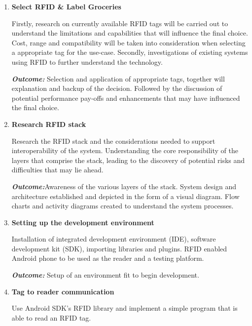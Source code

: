 \documentclass[a4paper, 11pt]{article}
\begin{document}
\begin{enumerate}
    \item \textbf{Select RFID \& Label Groceries}
   	\begin{flushleft}Firstly, research on currently available RFID tags will be carried out to understand the limitations and capabilities that will influence the final choice. Cost, range and compatibility will be taken into consideration when selecting a appropriate tag for the use-case. Secondly, investigations of existing systems using RFID to further understand the technology. 
	
	\emph{\textbf{Outcome:}} Selection and application of appropriate tags, together will explanation and backup of the decision. Followed by the discussion of potential performance pay-offs and enhancements that may have influenced the final choice.
	  	\end{flushleft}
	  \vspace{\baselineskip}

   \item \textbf{Research RFID stack}
   	\begin{flushleft}Research the RFID stack and the considerations needed to support interoperability of the system. Understanding the core responsibility of the layers that comprise the stack, leading to the discovery of potential risks and difficulties that may lie ahead.
	
	\emph{\textbf{Outcome:}}Awareness of the various layers of the stack. System design and architecture established and depicted in the form of a visual diagram. Flow charts and activity diagrams created to understand the system processes. 
	\end{flushleft}
	  \vspace{\baselineskip}
   \item \textbf{Setting up the development environment}
   	\begin{flushleft}Installation of integrated development environment (IDE), software development kit (SDK), importing libraries and plugins. RFID enabled Android phone to be used as the reader and a testing platform.  
		
		\emph{\textbf{Outcome:}}  Setup of an environment fit to begin development.
		\end{flushleft}
	  \vspace{\baselineskip}
	   \item \textbf{Tag to reader communication}
   	\begin{flushleft}Use Android SDK's RFID library and implement a simple program that is able to read an RFID tag.
		

\end{flushleft}
\end{enumerate}
\end{document}
